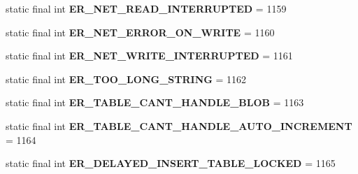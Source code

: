 \begin{DoxyCompactItemize}
static final int {\bfseries E\+R\+\_\+\+N\+E\+T\+\_\+\+R\+E\+A\+D\+\_\+\+I\+N\+T\+E\+R\+R\+U\+P\+T\+ED} = 1159
\item 
\mbox{\label{classcom_1_1mysql_1_1cj_1_1exceptions_1_1_mysql_error_numbers_a5f0f47cd0ce7103e82a115f1f7ed83cd}} 
static final int {\bfseries E\+R\+\_\+\+N\+E\+T\+\_\+\+E\+R\+R\+O\+R\+\_\+\+O\+N\+\_\+\+W\+R\+I\+TE} = 1160
\item 
\mbox{\label{classcom_1_1mysql_1_1cj_1_1exceptions_1_1_mysql_error_numbers_a56732a26368f311ec3a19cc7fda913cf}} 
static final int {\bfseries E\+R\+\_\+\+N\+E\+T\+\_\+\+W\+R\+I\+T\+E\+\_\+\+I\+N\+T\+E\+R\+R\+U\+P\+T\+ED} = 1161
\item 
\mbox{\label{classcom_1_1mysql_1_1cj_1_1exceptions_1_1_mysql_error_numbers_a9cc563316f00c65c05248d01e16ce245}} 
static final int {\bfseries E\+R\+\_\+\+T\+O\+O\+\_\+\+L\+O\+N\+G\+\_\+\+S\+T\+R\+I\+NG} = 1162
\item 
\mbox{\label{classcom_1_1mysql_1_1cj_1_1exceptions_1_1_mysql_error_numbers_a6b441c53f3194ad20f649907df070405}} 
static final int {\bfseries E\+R\+\_\+\+T\+A\+B\+L\+E\+\_\+\+C\+A\+N\+T\+\_\+\+H\+A\+N\+D\+L\+E\+\_\+\+B\+L\+OB} = 1163
\item 
\mbox{\label{classcom_1_1mysql_1_1cj_1_1exceptions_1_1_mysql_error_numbers_a6b4014a725071b2244069a936540209d}} 
static final int {\bfseries E\+R\+\_\+\+T\+A\+B\+L\+E\+\_\+\+C\+A\+N\+T\+\_\+\+H\+A\+N\+D\+L\+E\+\_\+\+A\+U\+T\+O\+\_\+\+I\+N\+C\+R\+E\+M\+E\+NT} = 1164
\item 
\mbox{\label{classcom_1_1mysql_1_1cj_1_1exceptions_1_1_mysql_error_numbers_a286dcf77261e2ab0f0ca9869580d7a5b}} 
static final int {\bfseries E\+R\+\_\+\+D\+E\+L\+A\+Y\+E\+D\+\_\+\+I\+N\+S\+E\+R\+T\+\_\+\+T\+A\+B\+L\+E\+\_\+\+L\+O\+C\+K\+ED} = 1165
\item 
\mbox{\label{classcom_1_1mysql_1_1cj_1_1exceptions_1_1_mysql_error_numbers_a55540a45b6a10b29cac782b370c6acaf}} 

\end{DoxyCompactItemize}
